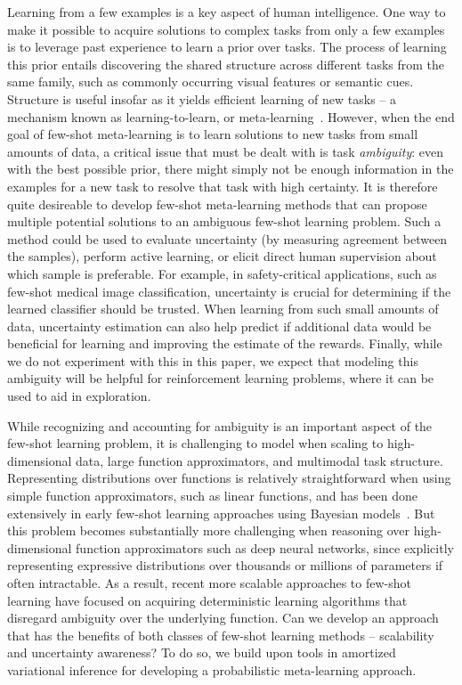 \documentclass{article}
\begin{document}
Learning from a few examples is a key aspect of human intelligence. One way to make it possible to acquire solutions to complex tasks from only a few examples is to leverage past experience to learn a prior over tasks. The process of learning this prior entails discovering the shared structure across different tasks from the same family, such as commonly occurring visual features or semantic cues.
Structure is useful insofar as it yields efficient learning of new tasks -- a mechanism known as learning-to-learn, or meta-learning~\citep{structure_learning_in_action}.
However, when the end goal of few-shot meta-learning is to learn solutions to new tasks from small amounts of data, a critical issue that must be dealt with is task \emph{ambiguity}: even with the best possible prior, there might simply not be enough information in the examples for a new task to resolve that task with high certainty. It is therefore quite desireable to develop few-shot meta-learning methods that can propose multiple potential solutions to an ambiguous few-shot learning problem. Such a method could be used to evaluate uncertainty (by measuring agreement between the samples), perform active learning, or elicit direct human supervision about which sample is preferable. For example, in safety-critical applications, such as few-shot medical image classification, uncertainty is crucial for determining if the learned classifier should be trusted. When learning from such small amounts of data, uncertainty estimation can also help predict if additional data would be beneficial for learning and improving the estimate of the rewards. Finally, while we do not experiment with this in this paper, we expect that modeling this ambiguity will be helpful for reinforcement learning problems, where it can be used to aid in exploration.


While recognizing and accounting for ambiguity is an important aspect of the few-shot learning problem, it is challenging to model
when scaling to high-dimensional data, large function approximators, and multimodal task structure. 
Representing distributions over functions is relatively straightforward when using simple function approximators, such as linear functions, and has been done extensively in early few-shot learning approaches using Bayesian models~\citep{tenenbaum1999bayesian,fei2003bayesian}. 
But this problem becomes substantially more challenging when reasoning over high-dimensional function approximators such as deep neural networks, since explicitly representing expressive distributions over thousands or millions of parameters if often intractable.
As a result, recent more scalable approaches to few-shot learning have focused on acquiring deterministic learning algorithms that disregard ambiguity over the underlying function.
Can we develop an approach that has the benefits of both classes of few-shot learning methods -- scalability and uncertainty awareness?
To do so, we build upon tools in amortized variational inference for developing a probabilistic meta-learning approach.
\end{document}
